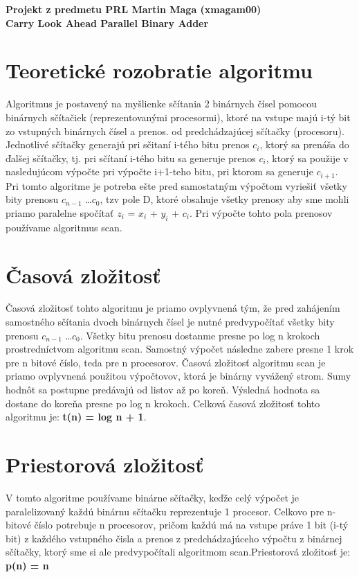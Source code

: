 \documentclass[11pt,a4paper,titlepage,final]{article}
\begin{document}
\raggedright\large{\textbf{Projekt z predmetu PRL Martin Maga (xmagam00) \\Carry Look Ahead Parallel Binary Adder}}

\section{Teoretické rozobratie algoritmu}
Algoritmus je postavený na myšlienke sčítania 2 binárnych čísel pomocou binárnych sčítačiek (reprezentovanými procesormi), ktoré na vstupe majú i-tý bit zo vstupných binárnych čísel a prenos. od predchádzajúcej sčítačky (procesoru). Jednotlivé sčítačky generajú pri sčitaní i-tého bitu prenos $c_i$, ktorý sa prenáša do ďalšej sčítačky, tj. pri sčítaní i-tého bitu sa generuje prenos $c_i$, ktorý sa použije v nasledujúcom výpočte pri výpočte i+1-teho bitu, pri ktorom sa generuje $c_{i+1}$. Pri tomto algoritme je potreba ešte pred samostatným výpočtom vyriešiť všetky bity prenosu $c_{n-1}$ \ldots $c_0$, tzv pole D, ktoré obsahuje všetky prenosy aby sme mohli priamo paralelne spočítať $z_i$ = $x_i$ + $y_i$ + $c_i$. Pri výpočte tohto pola prenosov používame algoritmus scan.

\section{Časová zložitosť}
Časová zložitosť tohto algoritmu je priamo ovplyvnená tým, že pred zahájením samostného sčítania dvoch binárnych čísel je nutné predvypočítať všetky bity prenosu $c_{n-1}$ \ldots $c_0$. Všetky bitu prenosu dostanme presne po log n krokoch prostredníctvom algoritmu scan. Samostný výpočet následne zabere presne 1 krok pre n bitové číslo, teda pre n procesorov. Časová zložitosť algoritmu scan je priamo ovplyvnená použitou výpočtovov, ktorá je binárny vyvážený strom. Sumy hodnôt sa postupne predávajú od listov až po koreň. Výsledná hodnota sa dostane do koreňa presne po log n krokoch. Celková časová zložitosť tohto algoritmu je: \textbf{t(n) = log n + 1}.

\section{Priestorová zložitosť}
V tomto algoritme používame binárne sčítačky, keďže celý výpočet je paralelizovaný každú binárnu sčítačku reprezentuje 1 procesor. Celkovo pre n-bitové číslo potrebuje n procesorov, pričom každú má na vstupe práve 1 bit (i-tý bit) z každého vstupného čisla a prenos z predchádzajúceho výpočtu z binárnej sčítačky, ktorý sme si ale predvypočítali algoritmom scan.Priestorová zložitosť je: \textbf{p(n) = n}
\end{document}
